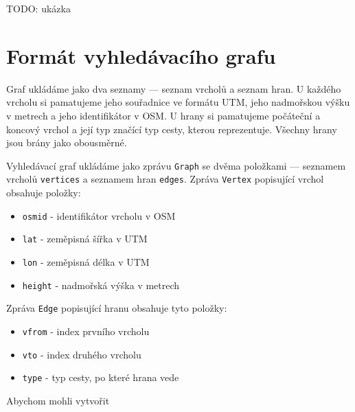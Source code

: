 TODO: ukázka

\section{Formát vyhledávacího grafu}
Graf ukládáme jako dva seznamy --- seznam vrcholů a seznam hran. U každého
vrcholu si pamatujeme jeho souřadnice ve formátu UTM, jeho nadmořskou výšku v
metrech a jeho identifikátor v OSM. U hrany si pamatujeme počáteční a koncový
vrchol a její typ značící typ cesty, kterou reprezentuje. Všechny hrany jsou
brány jako obousměrné.

Vyhledávací graf ukládáme jako zprávu \verb|Graph| se dvěma položkami ---
seznamem vrcholů \verb|vertices| a seznamem hran \verb|edges|. Zpráva
\verb|Vertex| popisující vrchol obsahuje položky:
\begin{itemize}
	\item \verb|osmid| - identifikátor vrcholu v OSM
	\item \verb|lat| - zeměpisná šířka v UTM
	\item \verb|lon| - zeměpisná délka v UTM
	\item \verb|height| - nadmořská výška v metrech
\end{itemize}
Zpráva \verb|Edge| popisující hranu obsahuje tyto položky:
\begin{itemize}
	\item \verb|vfrom| - index prvního vrcholu
	\item \verb|vto| - index druhého vrcholu
	\item \verb|type| - typ cesty, po které hrana vede
\end{itemize}

Abychom mohli vytvořit 
